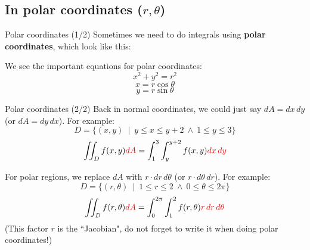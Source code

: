 \subsection{In polar coordinates ($r,\theta$)}
\begin{frame}{Polar coordinates (1/2)}
    Sometimes we need to do integrals using \textbf{polar coordinates}, which look like this:

    \vspace{0.3mm}
    \begin{minipage}{0.6\textwidth}
    
    \end{minipage}
    \begin{minipage}{0.35\textwidth}
        We see the important equations for polar coordinates:
        \[\boxed{x^2+y^2=r^2}\]
        \[\boxed{x=r\cos\theta}\]
        \[\boxed{y=r\sin\theta}\]
    \end{minipage}
\end{frame}

\begin{frame}{Polar coordinates (2/2)}
    Back in normal coordinates, we could just say $dA=dx\,dy$ (or $dA=dy\,dx$). For example:
    \[D=\{(x,y)~\mid~y\leq x\leq y+2~\land~1\leq y\leq 3\}\]
    \[\iint_D f(x,y) \textcolor{red}{dA} = \int_{1}^{3}\int_{y}^{y+2}f(x,y)\textcolor{red}{dx\,dy}\]

    \pause For polar regions, we replace $dA$ with $r\cdot dr\,d\theta$ (or $r\cdot d\theta\, dr$). For example:
    \[D=\{(r,\theta)~\mid~1\leq r\leq 2~\land~0\leq\theta\leq2\pi\}\]
    \[\iint_D f(r,\theta) \textcolor{red}{dA} = \int_{0}^{2\pi}\int_{1}^{2}f(r,\theta)\textcolor{red}{r\,dr\,d\theta}\]
     (This factor $r$ is the ``Jacobian", do not forget to write it when doing polar coordinates!)
\end{frame}


